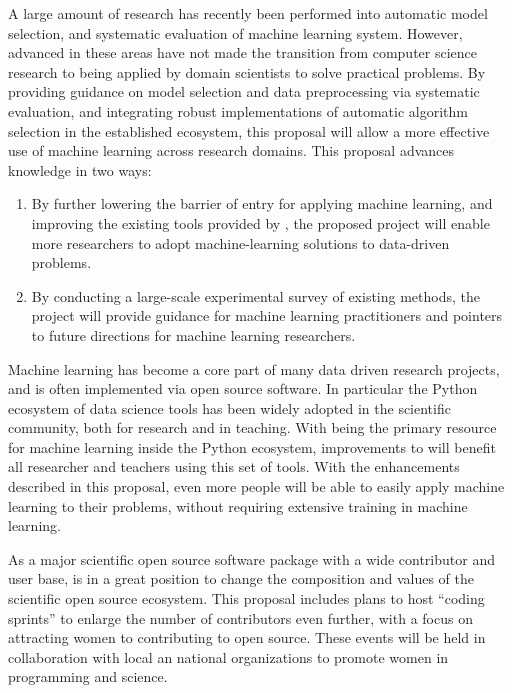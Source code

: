 A large amount of research has recently been performed into automatic model
selection, and systematic evaluation of machine learning system.
However, advanced in these areas have not made the transition from computer
science research to being applied by domain scientists to solve practical
problems.
By providing guidance on model selection and data preprocessing via
systematic evaluation, and integrating robust implementations of automatic
algorithm selection in the established \sklearn{} ecosystem, this proposal
will allow a more effective use of machine learning across research domains.
%
\vspace{-3mm}
\vspace{-3mm}
This proposal advances knowledge in two ways:
\begin{enumerate}
    \item By further lowering the barrier of entry for applying machine
        learning, and improving the existing tools provided by \sklearn{}, the
        proposed project will enable more researchers to adopt machine-learning
        solutions to data-driven problems.
    \item By conducting a large-scale experimental survey of existing methods,
        the project will provide guidance for machine learning practitioners
        and pointers to future directions for machine learning researchers.
\end{enumerate}
%
\vspace{-6mm}
\vspace{-3mm}
Machine learning has become a core part of many data driven research projects,
and is often implemented via open source software.
In particular the Python ecosystem of data science tools has been widely
adopted in the scientific community, both for research and in teaching.
With \sklearn{} being the primary resource for machine learning inside
the Python ecosystem, improvements to \sklearn{} will benefit all researcher
and teachers using this set of tools.
With the enhancements described in this proposal, even more people
will be able to easily apply machine learning to their problems,
without requiring extensive training in machine learning.

As a major scientific open source software package with a wide contributor
and user base, \sklearn{} is in a great position to change
the composition and values of the scientific open source ecosystem.
This proposal includes plans to host ``coding sprints'' to enlarge the number
of contributors even further, with a focus on attracting women to contributing
to open source. These events will be held in collaboration with local an
national organizations to promote women in programming and science.
